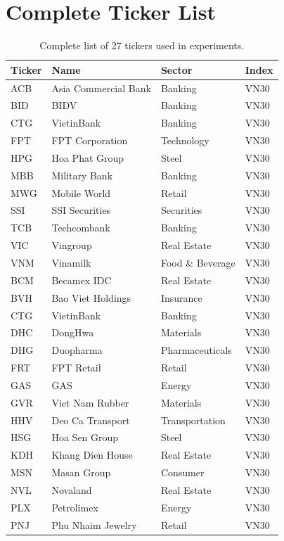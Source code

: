 \documentclass[runningheads]{llncs}
\begin{document}
\section{Complete Ticker List}
\label{sec:ticker_list}

\begin{table}[htbp]
\centering
\caption{Complete list of 27 tickers used in experiments.}
\label{tab:supp_tickers}
\begin{tabular}{llll}
\toprule
Ticker & Name & Sector & Index \\
\midrule
ACB & Asia Commercial Bank & Banking & VN30 \\
BID & BIDV & Banking & VN30 \\
CTG & VietinBank & Banking & VN30 \\
FPT & FPT Corporation & Technology & VN30 \\
HPG & Hoa Phat Group & Steel & VN30 \\
MBB & Military Bank & Banking & VN30 \\
MWG & Mobile World & Retail & VN30 \\
SSI & SSI Securities & Securities & VN30 \\
TCB & Techcombank & Banking & VN30 \\
VIC & Vingroup & Real Estate & VN30 \\
VNM & Vinamilk & Food \& Beverage & VN30 \\
BCM & Becamex IDC & Real Estate & VN30 \\
BVH & Bao Viet Holdings & Insurance & VN30 \\
CTG & VietinBank & Banking & VN30 \\
DHC & DongHwa & Materials & VN30 \\
DHG & Duopharma & Pharmaceuticals & VN30 \\
FRT & FPT Retail & Retail & VN30 \\
GAS & GAS & Energy & VN30 \\
GVR & Viet Nam Rubber & Materials & VN30 \\
HHV & Deo Ca Transport & Transportation & VN30 \\
HSG & Hoa Sen Group & Steel & VN30 \\
KDH & Khang Dien House & Real Estate & VN30 \\
MSN & Masan Group & Consumer & VN30 \\
NVL & Novaland & Real Estate & VN30 \\
PLX & Petrolimex & Energy & VN30 \\
PNJ & Phu Nhaim Jewelry & Retail & VN30 \\

\end{tabular}
\end{table}
\end{document}
